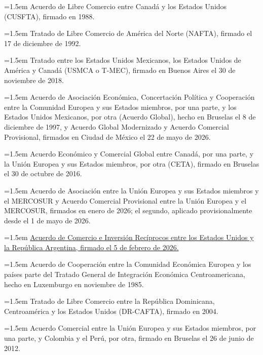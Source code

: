 \documentclass[10pt,a4paper]{article}
\begin{document}
\noindent\hangindent=1.5em Acuerdo de Libre Comercio entre Canadá y los Estados Unidos (CUSFTA), firmado en 1988.

\noindent\hangindent=1.5em Tratado de Libre Comercio de América del Norte (NAFTA), firmado el 17 de diciembre de 1992.

\noindent\hangindent=1.5em Tratado entre los Estados Unidos Mexicanos, los Estados Unidos de América y Canadá (USMCA o T-MEC), firmado en Buenos Aires el 30 de noviembre de 2018.

\noindent\hangindent=1.5em Acuerdo de Asociación Económica, Concertación Política y Cooperación entre la Comunidad Europea y sus Estados miembros, por una parte, y los Estados Unidos Mexicanos, por otra (Acuerdo Global), hecho en Bruselas el 8 de diciembre de 1997, y Acuerdo Global Modernizado y Acuerdo Comercial Provisional, firmados en Ciudad de México el 22 de mayo de 2026.

\noindent\hangindent=1.5em Acuerdo Económico y Comercial Global entre Canadá, por una parte, y la Unión Europea y sus Estados miembros, por otra (CETA), firmado en Bruselas el 30 de octubre de 2016.

\noindent\hangindent=1.5em Acuerdo de Asociación entre la Unión Europea y sus Estados miembros y el MERCOSUR y Acuerdo Comercial Provisional entre la Unión Europea y el MERCOSUR, firmados en enero de 2026; el segundo, aplicado provisionalmente desde el 1 de mayo de 2026.

\noindent\hangindent=1.5em \href{https://www.thompsonhinesmartrade.com/2026/02/united-states-and-argentina-sign-agreement-on-reciprocal-trade/}{Acuerdo de Comercio e Inversión Recíprocos entre los Estados Unidos y la República Argentina, firmado el 5 de febrero de 2026.}

\noindent\hangindent=1.5em Acuerdo de Cooperación entre la Comunidad Económica Europea y los países parte del Tratado General de Integración Económica Centroamericana, hecho en Luxemburgo en noviembre de 1985.

\noindent\hangindent=1.5em Tratado de Libre Comercio entre la República Dominicana, Centroamérica y los Estados Unidos (DR-CAFTA), firmado en 2004.

\noindent\hangindent=1.5em Acuerdo Comercial entre la Unión Europea y sus Estados miembros, por una parte, y Colombia y el Perú, por otra, firmado en Bruselas el 26 de junio de 2012.
\end{document}
